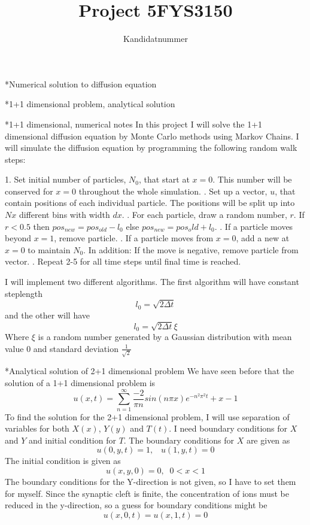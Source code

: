 \documentclass[a4paper, 12pt, titlepage]{article}
\author{Kandidatnummer }
\title{Project 5}
\title{FYS3150}
\newcommand{\f}[2]{\frac{#1}{#2}}
\newcommand{\beq}{\begin{equation*}}
\newcommand{\eeq}{\end{equation*}}
\newcommand{\n}{\newline}
\begin{document}
 \maketitle
 \newpage
 
 \begin{section}*{Numerical solution to diffusion equation}
 \end{section} 
 
 \begin{section}*{1+1 dimensional problem, analytical solution}
  
 \end{section}
  
 \begin{section}*{1+1 dimensional, numerical notes}
  In this project I will solve the 1+1 dimensional diffusion equation by Monte Carlo methods using Markov 
  Chains. I will simulate the diffusion equation by programming the following random walk steps: \par
  1. Set initial number of particles, $N_0$, that start at $x=0$. This number will be conserved for $x = 0$
  throughout the whole simulation. \n
  2. Set up a vector, $u$, that contain positions of each individual particle. The positions will be split
  up into $Nx$ different bins with width $dx$. \n
  3. For each particle, draw a random number, $r$. If $ r < 0.5 $ then $ pos_{new} = pos_{old} - l_0$
     else $pos_{new} = pos_old + l_0$. \n
  4. If a particle moves beyond $x=1$, remove particle. \n
  5. If a particle moves from $x=0$, add a new at $x=0$ to maintain $N_0$. In addition: If the move is 
     negative, remove particle from vector. \n
  6. Repeat 2-5 for all time steps until final time is reached. \par
  I will implement two different algorithms. The first algorithm will have constant steplength
  \beq l_0 = \sqrt{2\Delta t} \eeq 
  and the other will have \beq l_0 = \sqrt{2\Delta t}\xi \eeq
  Where $\xi$ is a random number generated by a Gaussian distribution with mean value $0$ and standard
  deviation $\frac{1}{\sqrt{2}}$
 \end{section}
 
 
 \begin{section}*{Analytical solution of 2+1 dimensional problem} 
  We have seen before that the solution of a 1+1 dimensional problem is 
  \beq u(x,t) = \sum_{n=1}^{\infty} \f{-2}{\pi n} sin(n\pi x) e^{-n^2\pi ^2 t} + x - 1 \eeq
  To find the solution for the 2+1 dimensional problem, I will use separation of variables for both
  $X(x)$, $Y(y)$ and $T(t)$. I need boundary conditions for $X$ and $Y$ and initial condition for $T$.
  The boundary conditions for $X$ are given as \beq u(0,y,t) = 1, \;\;\; u(1,y,t) = 0 \eeq
  The initial condition is given as
  \beq u(x,y,0) = 0, \;\; 0 < x < 1 \eeq
  The boundary conditions for the Y-direction is not given, so I have to set them for myself. Since the 
  synaptic cleft is finite, the concentration of ions must be reduced in the y-direction, so a guess for 
  boundary conditions might be \beq u(x,0,t) = u(x,1,t) = 0 \eeq
  \end{section}

  
\end{document}
